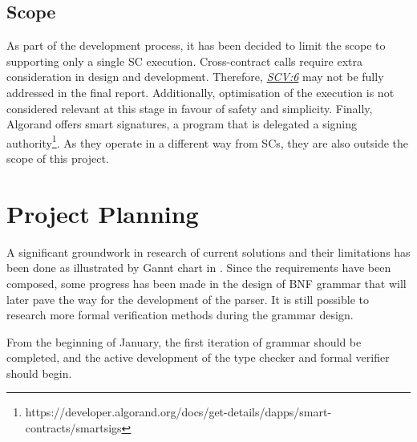 \documentclass[oneside]{ecsproject}     %
\newcommand{\vref}[1]{\textit{\hyperref[#1]{#1}}}
\begin{document}
\section{Scope}

As part of the development process, it has been decided to limit the scope to supporting only a single SC execution.
Cross-contract calls require extra consideration in design and development. Therefore, \vref{SCV:6} may not be fully addressed in the final report.
Additionally, optimisation of the execution is not considered relevant at this stage in favour of safety and simplicity.
Finally, Algorand offers smart signatures, a program that is delegated a signing authority\footnote{https://developer.algorand.org/docs/get-details/dapps/smart-contracts/smartsigs}.
As they operate in a different way from SCs, they are also outside the scope of this project.

\begingroup
\renewcommand{\cleardoublepage}{}
\renewcommand{\clearpage}{}
\chapter{Project Planning}
\endgroup

A significant groundwork in research of current solutions and their limitations has been done as illustrated by Gannt chart in .
Since the requirements have been composed, some progress has been made in the design of BNF grammar that will later pave the way for the development
of the parser. It is still possible to research more formal verification methods during the grammar design.

From the beginning of January, the first iteration of grammar should be completed, and the active development of the type checker and formal verifier should begin.



\appendix
\end{document}
